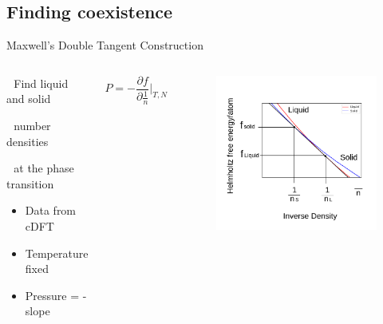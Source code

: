 \documentclass{beamer}
\begin{document}
\subsection*{Finding coexistence}
\begin{frame}{Maxwell's Double Tangent Construction}
	\begin{columns}[t]
		\vspace{-0.5em}
		\begin{block}{$~~~$Find liquid and solid 
		
		$~~~$number densities 
		
		$~~~$at the phase transition}
			\begin{itemize}
				\item Data from cDFT 
				\item Temperature fixed
				\item Pressure = -slope
			\end{itemize}
	    \end{block}
	    \begin{displaymath}{P = -\frac{\partial{f}}{\partial{\frac{1}{n}}}\bigg|_{T,N}}\end{displaymath} 
		\vspace{-4em}
            \begin{figure}
                \centering
                \includegraphics[width=1.2\columnwidth]{figs/MaxwellDTC-Fig1-realplot.pdf}
            \end{figure}
	\end{columns}	
\end{frame}
\end{document}
